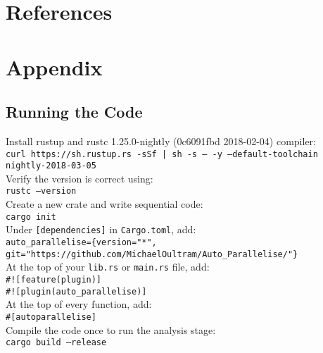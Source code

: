 \chapter{References}
\vspace{-2em}
\printbibliography[heading=none]

\chapter{Appendix}

\section{Running the Code}
\label{sec:running-the-code}
Install rustup and rustc 1.25.0-nightly (0c6091fbd 2018-02-04) compiler: \\
\texttt{curl https://sh.rustup.rs -sSf | sh -s -- -y --default-toolchain nightly-2018-03-05} \\

Verify the version is correct using: \\
\texttt{rustc --version} \\

Create a new crate and write sequential code: \\
\texttt{cargo init} \\

Under \texttt{[dependencies]} in \texttt{Cargo.toml}, add: \\
\texttt{auto\_parallelise=\{version="*", git="https://github.com/MichaelOultram/Auto\_Parallelise/"\}} \\

At the top of your \texttt{lib.rs} or \texttt{main.rs} file, add: \\
\texttt{\#![feature(plugin)]} \\
\texttt{\#![plugin(auto\_parallelise)]} \\

At the top of every function, add: \\
\texttt{\#[autoparallelise]} \\

Compile the code once to run the analysis stage: \\
\texttt{cargo build --release} \\


